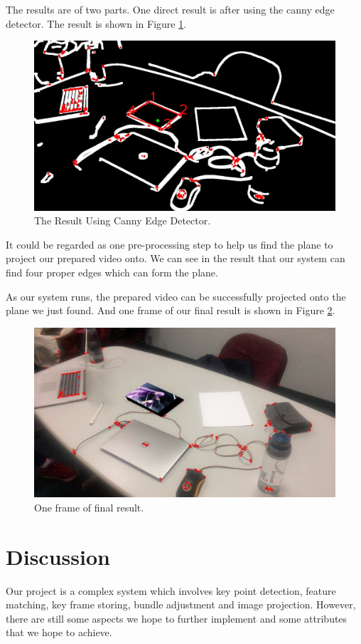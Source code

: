 \documentclass[paper=a4, fontsize=14pt]{scrartcl}
\numberwithin{equation}{section}		%
\numberwithin{figure}{section}			%
\numberwithin{table}{section}				%
\begin{document}
The results are of two parts.
One direct result is after using the canny edge detector.
The result is shown in Figure \ref{fig:canny}.
\begin{figure}[h]
	\centering
	\includegraphics[width=.80\linewidth]{images/canny.jpeg}
	\caption{The Result Using Canny Edge Detector.}
	\label{fig:canny}
\end{figure}

It could be regarded as one pre-processing step to help us find the plane to project our prepared video onto.
We can see in the result that our system can find four proper edges which can form the plane.

As our system runs, the prepared video can be successfully projected onto the plane we just found.
And one frame of our final result is shown in Figure \ref{fig:final}.
\begin{figure}[h]
	\centering
	\includegraphics[width=.80\linewidth]{images/final.jpeg}
	\caption{One frame of final result.}
	\label{fig:final}
\end{figure}

\newpage
\section{Discussion}\label{discussion}
Our project is a complex system which involves key point detection, feature matching, key frame storing, bundle adjustment and image projection. However, there are still some aspects we hope to further implement and some attributes that we hope to achieve.
\end{document}

